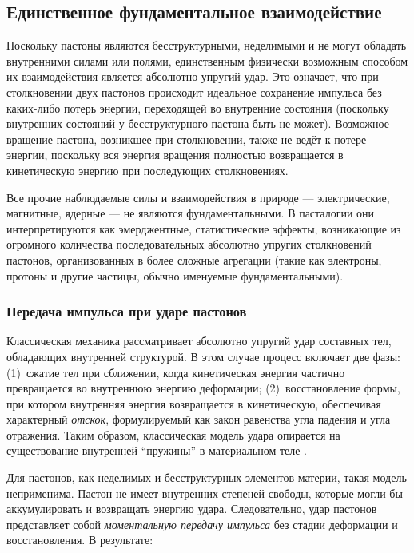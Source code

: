 \documentclass[pdflatex,sn-mathphys-num,referee]{sn-jnl}
\begin{document}
\subsection{Единственное фундаментальное взаимодействие}\label{subsec:interaction}

Поскольку пастоны являются бесструктурными, неделимыми и не могут обладать внутренними силами или полями, единственным физически возможным способом их взаимодействия является абсолютно упругий удар. Это означает, что при столкновении двух пастонов происходит идеальное сохранение импульса без каких-либо потерь энергии, переходящей во внутренние состояния (поскольку внутренних состояний у бесструктурного пастона быть не может). Возможное вращение пастона, возникшее при столкновении, также не ведёт к потере энергии, поскольку вся энергия вращения полностью возвращается в кинетическую энергию при последующих столкновениях.

Все прочие наблюдаемые силы и взаимодействия в природе --- электрические, магнитные, ядерные --- не являются фундаментальными. В пасталогии они интерпретируются как эмерджентные, статистические эффекты, возникающие из огромного количества последовательных абсолютно упругих столкновений пастонов, организованных в более сложные агрегации (такие как электроны, протоны и другие частицы, обычно именуемые фундаментальными).

\subsubsection{Передача импульса при ударе пастонов}\label{subsubsec:impulse-transfer}

Классическая механика рассматривает абсолютно упругий удар составных тел, обладающих внутренней структурой. В этом случае процесс включает две фазы: (1)~сжатие тел при сближении, когда кинетическая энергия частично превращается во внутреннюю энергию деформации; (2)~восстановление формы, при котором внутренняя энергия возвращается в кинетическую, обеспечивая характерный \emph{отскок}, формулируемый как закон равенства угла падения и угла отражения. Таким образом, классическая модель удара опирается на существование внутренней ``пружины'' в материальном теле \cite{feynman-lectures-v1}.

Для пастонов, как неделимых и бесструктурных элементов материи, такая модель неприменима. Пастон не имеет внутренних степеней свободы, которые могли бы аккумулировать и возвращать энергию удара. Следовательно, удар пастонов представляет собой \emph{моментальную передачу импульса} без стадии деформации и восстановления. В результате:
\end{document}
